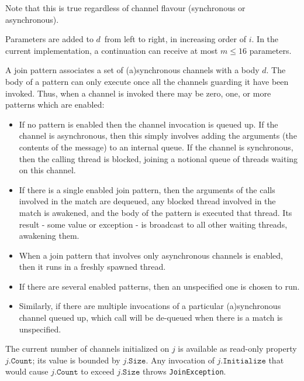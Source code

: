 \documentclass{article}
\newcommand{\maxbindings}{16}
\newcommand{\typeref}[1]{{\texttt{#1}}}
\newcommand{\dotinitialize}{\texttt{.Initialize}}
\newcommand{\dotsize}{\texttt{.Size}}
\newcommand{\dotcount}{\texttt{.Count}}
\newcommand{\And}{\texttt{And}}
\newcommand{\AndPair}{\texttt{AndPair}}
\newcommand{\channel}{\ensuremath{c}}
\newcommand{\joinobj}{\ensuremath{j}}
\newcommand{\delegate}{\ensuremath{d}}
\begin{document}
Note that this is true regardless of channel flavour (synchronous or asynchronous).

Parameters are added to \delegate\ from left to right, in increasing order of 
$i$. In the current implementation, a continuation can receive at most $m\leq\maxbindings$ parameters.



A join pattern associates a set of (a)synchronous channels with a body \delegate.
The body of a pattern can only execute once all the
channels guarding it have been invoked. Thus, when a channel is 
invoked there may be zero, one, or more patterns which are enabled:
\begin{itemize}
\item
If no pattern is enabled then the channel invocation is queued up. If the channel is asynchronous,
then this simply involves adding the arguments (the contents of the message) to an internal queue.
If the channel is synchronous, then the calling thread is blocked, joining a notional queue of threads waiting on this channel.
\item
If there is a single enabled join pattern, then the arguments of the calls involved in the match are dequeued,
any blocked thread involved in the match is awakened, and the body of the pattern is executed that thread.
Its result - some value or exception - is broadcast to all other waiting threads, awakening them.
\item When a join pattern that involves only asynchronous channels is enabled, then it runs in a freshly spawned thread.
\item If there are several enabled patterns, then an unspecified one is chosen to run.
\item Similarly, if there are multiple invocations of a particular (a)synchronous channel queued up, 
which call will be de-queued when there is a match is unspecified.
\end{itemize}

The current number of channels initialized on $\joinobj$ is available as read-only property $\joinobj\dotcount$; 
its value is bounded by $\joinobj\dotsize$.
Any invocation of $\joinobj\dotinitialize$ that would cause $\joinobj\dotcount$ to exceed $\joinobj\dotsize$ throws \typeref{JoinException}.
\end{document}
